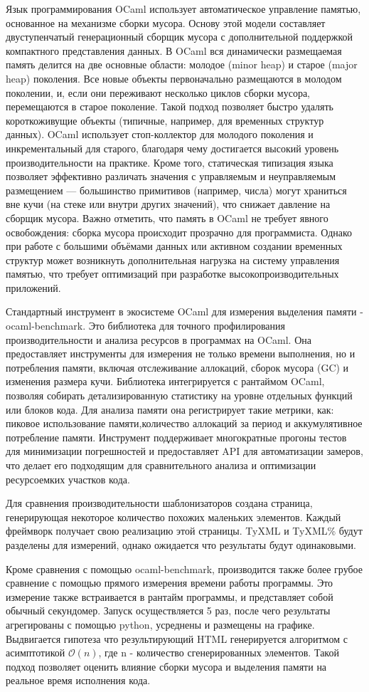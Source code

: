 Язык программирования OCaml использует автоматическое управление памятью, основанное на механизме сборки мусора.
Основу этой модели составляет двуступенчатый генерационный сборщик мусора с дополнительной поддержкой компактного представления данных.
В OCaml вся динамически размещаемая память делится на две основные области: молодое (minor heap) и старое (major heap) поколения.
Все новые объекты первоначально размещаются в молодом поколении, и, если они переживают несколько циклов сборки мусора, перемещаются в старое поколение.
Такой подход позволяет быстро удалять короткоживущие объекты (типичные, например, для временных структур данных).
OCaml использует стоп-коллектор для молодого поколения и инкрементальный для старого, благодаря чему достигается высокий уровень производительности на практике.
Кроме того, статическая типизация языка позволяет эффективно различать значения с управляемым и неуправляемым размещением — большинство примитивов (например, числа) могут храниться вне кучи (на стеке или внутри других значений), что снижает давление на сборщик мусора.
Важно отметить, что память в OCaml не требует явного освобождения: сборка мусора происходит прозрачно для программиста.
Однако при работе с большими объёмами данных или активном создании временных структур может возникнуть дополнительная нагрузка на систему управления памятью, что требует оптимизаций при разработке высокопроизводительных приложений.

Стандартный инструмент в экосистеме OCaml для измерения выделения памяти - ocaml-benchmark.
Это библиотека для точного профилирования производительности и анализа ресурсов в программах на OCaml.
Она предоставляет инструменты для измерения не только времени выполнения, но и потребления памяти, включая отслеживание аллокаций, сборок мусора (GC) и изменения размера кучи.
Библиотека интегрируется с рантаймом OCaml, позволяя собирать детализированную статистику на уровне отдельных функций или блоков кода.
Для анализа памяти она регистрирует такие метрики, как: пиковое использование памяти,количество аллокаций за период и аккумулятивное потребление памяти.
Инструмент поддерживает многократные прогоны тестов для минимизации погрешностей и предоставляет API для автоматизации замеров, что делает его подходящим для сравнительного анализа и оптимизации ресурсоемких участков кода.

Для сравнения производительности шаблонизаторов создана страница, генерирующая некоторое количество похожих маленьких элементов.
Каждый фреймворк получает свою реализацию этой страницы.
TyXML и TyXML\% будут разделены для измерений, однако ожидается что результаты будут одинаковыми.

Кроме сравнения с помощью ocaml-benchmark, производится также более грубое сравнение с помощью прямого измерения времени работы программы.
Это измерение также встраивается в рантайм программы, и представляет собой обычный секундомер.
Запуск осуществляется 5 раз, после чего результаты агрегированы с помощью python, усреднены и размещены на графике.
Выдвигается гипотеза что результирующий HTML генерируется алгоритмом с асимптотикой $\mathcal{O}(n)$, где n - количество сгенерированных элементов.
Такой подход позволяет оценить влияние сборки мусора и выделения памяти на реальное время исполнения кода.
